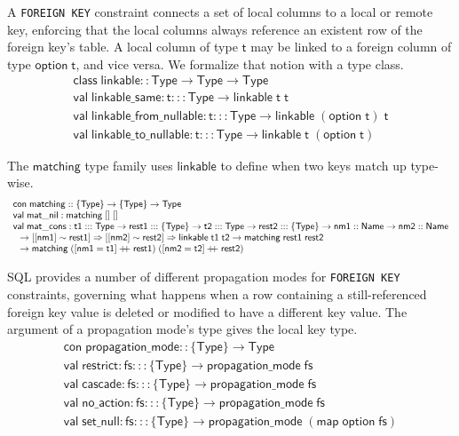\documentclass{article}
\newcommand{\mt}[1]{\mathsf{#1}}
\newcommand{\rc}{+ \hspace{-.075in} + \;}
\begin{document}
A \texttt{FOREIGN KEY} constraint connects a set of local columns to a local or remote key, enforcing that the local columns always reference an existent row of the foreign key's table.  A local column of type $\mt{t}$ may be linked to a foreign column of type $\mt{option} \; \mt{t}$, and vice versa.  We formalize that notion with a type class.
$$\begin{array}{l}
  \mt{class} \; \mt{linkable} :: \mt{Type} \to \mt{Type} \to \mt{Type} \\
  \mt{val} \; \mt{linkable\_same} : \mt{t} ::: \mt{Type} \to \mt{linkable} \; \mt{t} \; \mt{t} \\
  \mt{val} \; \mt{linkable\_from\_nullable} : \mt{t} ::: \mt{Type} \to \mt{linkable} \; (\mt{option} \; \mt{t}) \; \mt{t} \\
  \mt{val} \; \mt{linkable\_to\_nullable} : \mt{t} ::: \mt{Type} \to \mt{linkable} \; \mt{t} \; (\mt{option} \; \mt{t})
\end{array}$$

The $\mt{matching}$ type family uses $\mt{linkable}$ to define when two keys match up type-wise.
$$\begin{array}{l}
  \mt{con} \; \mt{matching} :: \{\mt{Type}\} \to \{\mt{Type}\} \to \mt{Type} \\
  \mt{val} \; \mt{mat\_nil} : \mt{matching} \; [] \; [] \\
  \mt{val} \; \mt{mat\_cons} : \mt{t1} ::: \mt{Type} \to \mt{rest1} ::: \{\mt{Type}\} \to \mt{t2} ::: \mt{Type} \to \mt{rest2} ::: \{\mt{Type}\} \to \mt{nm1} :: \mt{Name} \to \mt{nm2} :: \mt{Name} \\
  \hspace{.1in} \to [[\mt{nm1}] \sim \mt{rest1}] \Rightarrow [[\mt{nm2}] \sim \mt{rest2}] \Rightarrow \mt{linkable} \; \mt{t1} \; \mt{t2} \to \mt{matching} \; \mt{rest1} \; \mt{rest2} \\
  \hspace{.1in} \to \mt{matching} \; ([\mt{nm1} = \mt{t1}] \rc \mt{rest1}) \; ([\mt{nm2} = \mt{t2}] \rc \mt{rest2})
\end{array}$$

SQL provides a number of different propagation modes for \texttt{FOREIGN KEY} constraints, governing what happens when a row containing a still-referenced foreign key value is deleted or modified to have a different key value.  The argument of a propagation mode's type gives the local key type.
$$\begin{array}{l}
  \mt{con} \; \mt{propagation\_mode} :: \{\mt{Type}\} \to \mt{Type} \\
  \mt{val} \; \mt{restrict} : \mt{fs} ::: \{\mt{Type}\} \to \mt{propagation\_mode} \; \mt{fs} \\
  \mt{val} \; \mt{cascade} : \mt{fs} ::: \{\mt{Type}\} \to \mt{propagation\_mode} \; \mt{fs} \\
  \mt{val} \; \mt{no\_action} : \mt{fs} ::: \{\mt{Type}\} \to \mt{propagation\_mode} \; \mt{fs} \\
  \mt{val} \; \mt{set\_null} : \mt{fs} ::: \{\mt{Type}\} \to \mt{propagation\_mode} \; (\mt{map} \; \mt{option} \; \mt{fs})
\end{array}$$
\end{document}
